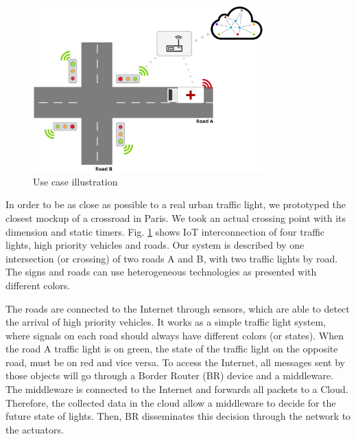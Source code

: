 \documentclass[conference]{../../setup/IEEEtran}
\begin{document}
\begin{figure}[!htb]
\centering
\includegraphics[width=3.5in]{Figures/CrossRoadModel_V1.eps}
\caption{Use case illustration}
\label{fig:CrossRoadModel.eps}
\end{figure}

In order to be as close as possible to a real urban traffic light, we prototyped the closest mockup of a crossroad in Paris. We took an actual crossing point with its dimension and static timers. Fig. \ref{fig:CrossRoadModel.eps} shows IoT interconnection of four traffic lights, high priority vehicles and roads.  Our system is described by one intersection (or crossing) of two roads A and B, with two traffic lights by road. The signs and roads can use heterogeneous technologies as presented with different colors. 

The roads are connected to the Internet through sensors, which are able to detect the arrival of high priority vehicles. It works as a simple traffic light system, where signals on each road should always have different colors (or states). When the road A traffic light is on green, the state of the traffic light on the opposite road, must be on red and vice versa. To access the Internet, all messages sent by those objects will go through a Border Router (BR) device and a middleware. The middleware is connected to the Internet and forwards all packets to a Cloud. Therefore, the collected data in the cloud allow a middleware to decide for the future state of lights. Then,  BR disseminates this decision through the network to the actuators.   



%
\end{document}
